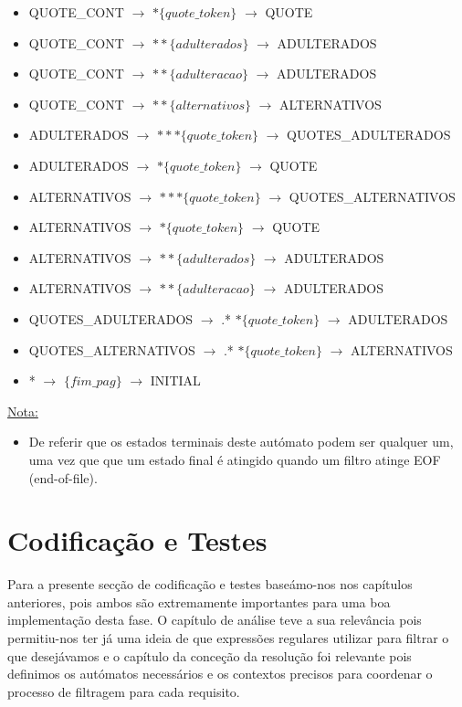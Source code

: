 \documentclass[11pt,a4paper]{report}
\begin{document}
\begin{itemize}
\begin{itemize}
			\item QUOTE\_CONT $\rightarrow$ $*\{quote\_token\}$ $\rightarrow$ QUOTE
			\item QUOTE\_CONT $\rightarrow$ $**\{adulterados\}$ $\rightarrow$ ADULTERADOS
			\item QUOTE\_CONT $\rightarrow$ $**\{adulteracao\}$ $\rightarrow$ ADULTERADOS
			\item QUOTE\_CONT $\rightarrow$ $**\{alternativos\}$ $\rightarrow$ ALTERNATIVOS
			\item ADULTERADOS $\rightarrow$ $***\{quote\_token\}$ $\rightarrow$ QUOTES\_ADULTERADOS
			\item ADULTERADOS $\rightarrow$ $*\{quote\_token\}$ $\rightarrow$ QUOTE
			\item ALTERNATIVOS $\rightarrow$ $***\{quote\_token\}$ $\rightarrow$ QUOTES\_ALTERNATIVOS
			\item ALTERNATIVOS $\rightarrow$ $*\{quote\_token\}$ $\rightarrow$ QUOTE
			\item ALTERNATIVOS $\rightarrow$ $**\{adulterados\}$ $\rightarrow$ ADULTERADOS
			\item ALTERNATIVOS $\rightarrow$ $**\{adulteracao\}$ $\rightarrow$ ADULTERADOS
			\item QUOTES\_ADULTERADOS $\rightarrow$ .* $*\{quote\_token\}$ $\rightarrow$ ADULTERADOS
			\item QUOTES\_ALTERNATIVOS $\rightarrow$ .* $*\{quote\_token\}$ $\rightarrow$ ALTERNATIVOS
			\item * $\rightarrow$ $\{fim\_pag\}$ $\rightarrow$ INITIAL
		\end{itemize}
\end{itemize}

\vspace{0.5cm}

\underline{Nota:}
\begin{itemize}
	\item De referir que os estados terminais deste autómato podem ser qualquer um, uma vez que que um estado final é atingido quando um filtro atinge EOF (end-of-file).
\end{itemize}

\chapter{Codificação e Testes}
\label{chap:codificacao}

Para a presente secção de codificação e testes baseámo-nos nos capítulos anteriores, pois ambos são extremamente importantes para uma boa implementação desta fase. O capítulo de análise teve a sua relevância pois permitiu-nos ter já uma ideia de que expressões regulares utilizar para filtrar o que desejávamos e o capítulo da conceção da resolução foi relevante pois definimos os autómatos necessários e os contextos precisos para coordenar o processo de filtragem para cada requisito.
\end{document}
